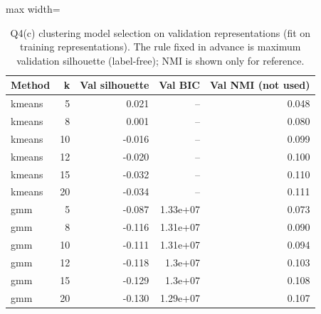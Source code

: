 \begin{table}[t]
\centering
\footnotesize
\setlength{\tabcolsep}{3.5pt}
\begin{adjustbox}{max width=\linewidth}
\begin{tabular}{lrrrr}
\toprule
Method & k & Val silhouette & Val BIC & Val NMI (not used) \\
\midrule
kmeans & 5 & 0.021 & -- & 0.048 \\
kmeans & 8 & 0.001 & -- & 0.080 \\
kmeans & 10 & -0.016 & -- & 0.099 \\
kmeans & 12 & -0.020 & -- & 0.100 \\
kmeans & 15 & -0.032 & -- & 0.110 \\
kmeans & 20 & -0.034 & -- & 0.111 \\
gmm & 5 & -0.087 & 1.33e+07 & 0.073 \\
gmm & 8 & -0.116 & 1.31e+07 & 0.090 \\
gmm & 10 & -0.111 & 1.31e+07 & 0.094 \\
gmm & 12 & -0.118 & 1.3e+07 & 0.103 \\
gmm & 15 & -0.129 & 1.3e+07 & 0.108 \\
gmm & 20 & -0.130 & 1.29e+07 & 0.107 \\
\bottomrule
\end{tabular}
\end{adjustbox}
\caption{Q4(c) clustering model selection on validation representations (fit on training representations). The rule fixed in advance is maximum validation silhouette (label-free); NMI is shown only for reference.}
\label{tab:q4csel}
\end{table}
